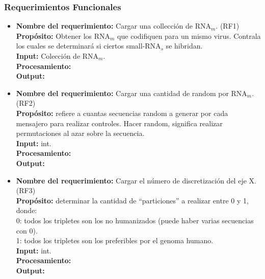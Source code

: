 \documentclass[12pt,a4paper,spanish]{article}
\begin{document}
	\subsubsection{Requerimientos Funcionales}
	\begin{itemize}
		\item \textbf{Nombre del requerimiento:} Cargar una collección de RNA$_m$. (RF1)\\
 	    \textbf{Propósito:} Obtener los RNA$_m$ que codifiquen para un mismo virus. Contrala los cuales se determinará si ciertos small-RNA$_s$ 								se hibridan.\\
		\textbf{Input:} Colección de RNA$_m$.\\
		\textbf{Procesamiento:} \\
		\textbf{Output:} \\

		\item \textbf{Nombre del requerimiento:} Cargar una cantidad de random por RNA$_m$. (RF2)\\
 	    \textbf{Propósito:} refiere a cuantas secuencias random a generar por cada mensajero para realizar controles. Hacer random, significa realizar 								permutaciones al azar sobre la secuencia. \\														
		\textbf{Input:} int.\\
		\textbf{Procesamiento:} \\
		\textbf{Output:} \\

		\item \textbf{Nombre del requerimiento:} Cargar el número de discretización del eje X. (RF3)\\
 	    \textbf{Propósito:} determinar la cantidad de  ``particiones'' a realizar entre 0 y 1, donde: \\
						 0: todos los tripletes son los no humanizados (puede haber varias secuencias con 0). \\
						 1: todos los tripletes son los preferibles por el genoma humano. \\
		\textbf{Input:} int.\\
		\textbf{Procesamiento:} \\
		\textbf{Output:} \\


\end{itemize}
\end{document}
